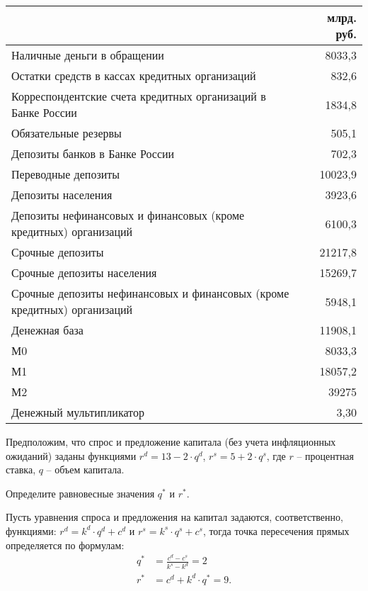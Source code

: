 \documentclass[12pt, table]{exam}
\begin{document}
\begin{questions}
\begin{solution}[23em]
\small	
\begin{tabularx}{\linewidth}[b]{@{}>{\raggedright\arraybackslash}Xr@{}}				& млрд. руб.\\
	\toprule
	Наличные деньги в обращении & 8033,3 \\
	Остатки средств в кассах кредитных организаций & 832,6 \\
	Корреспондентские счета кредитных организаций в Банке России & 1834,8 \\
	Обязательные резервы & 505,1 \\
	Депозиты банков в Банке России & 702,3 \\
	Переводные депозиты & 10023,9 \\
	Депозиты населения & 3923,6 \\
	Депозиты нефинансовых и финансовых (кроме кредитных) организаций & 6100,3 \\
	Срочные депозиты & 21217,8 \\
	Срочные депозиты населения & 15269,7 \\
	Срочные депозиты нефинансовых и финансовых (кроме кредитных) организаций & 5948,1 \\
	\midrule
	Денежная база & 11908,1 \\
	М0    & 8033,3 \\
	М1    & 18057,2 \\
	М2    & 39275 \\
	Денежный мультипликатор & 3,30 \\
	\bottomrule
\end{tabularx}%
\normalsize
	
\end{solution}

\pagebreak	
\question[10] Предположим, что спрос и предложение капитала (без учета инфляционных ожиданий) заданы функциями 	
$r^d=13-2 \cdot q^d$, $r^s=5 + 2 \cdot q^s$, где 	
$r$ – процентная ставка, 	
$q$ – объем капитала.	
\noaddpoints
\begin{subparts}
	\subpart[2] Определите равновесные значения $q^*$ и $r^*$.

	\begin{solution}[12em]

		\raggedright
		Пусть уравнения спроса и предложения на капитал задаются, соответственно, функциями: $r^d=k^d\cdot q^d +c^d$ и $r^s=k^s\cdot q^s +c^s$, тогда точка пересечения прямых определяется по формулам:
		\begin{align*}
		q^*&=\frac{c^d-c^s}{k^s-k^d}=2\\
		r^*&=c^d + k^d \cdot q^* =9.
		\end{align*}
	\end{solution}
	

\end{subparts}
\end{questions}
\end{document}
